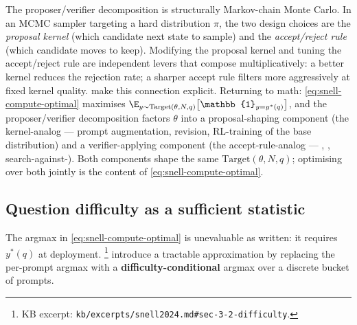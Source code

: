 \begin{analogy}
The proposer/verifier decomposition is structurally Markov-chain Monte
Carlo. In an MCMC sampler targeting a hard distribution $\pi$, the two
design choices are the \emph{proposal kernel} (which candidate next
state to sample) and the \emph{accept/reject rule} (which candidate
moves to keep). Modifying the proposal kernel and tuning the
accept/reject rule are independent levers that compose multiplicatively:
a better kernel reduces the rejection rate; a sharper accept rule
filters more aggressively at fixed kernel quality. \citet[\S 2]{snell2024}
make this connection explicit.
Returning to math:
\cref{eq:snell-compute-optimal} maximises
$\E_{y \sim \mathrm{Target}(\theta,N,q)}\!\left[\mathbb{1}_{y=y^\ast(q)}\right]$,
and the proposer/verifier decomposition factors $\theta$ into a
proposal-shaping component (the kernel-analog --- prompt augmentation,
revision, RL-training of the base distribution) and a verifier-applying
component (the accept-rule-analog --- , , search-against-).
Both components shape the same $\mathrm{Target}(\theta, N, q)$;
optimising over both jointly is the content of \cref{eq:snell-compute-optimal}.
\end{analogy}

\subsection{Question difficulty as a sufficient statistic}
\label{sec:snell-difficulty}

The argmax in \cref{eq:snell-compute-optimal} is unevaluable as written:
it requires $y^\ast(q)$ at deployment. \citet[\S 3.2]{snell2024}%
\footnote{KB excerpt: \nolinkurl{kb/excerpts/snell2024.md#sec-3-2-difficulty}.}
introduce a tractable approximation by replacing the per-prompt argmax
with a \textbf{difficulty-conditional} argmax over a discrete bucket of
prompts.

